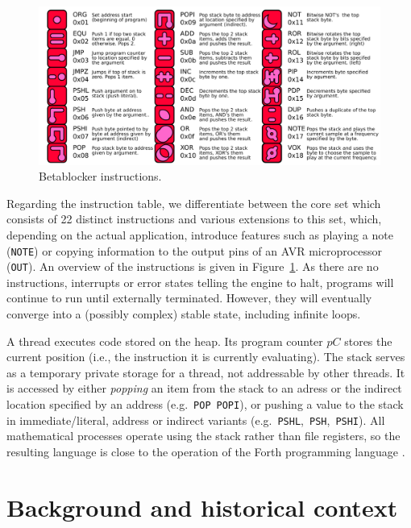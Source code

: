 \documentclass[letterpaper, 12pt]{article}
\begin{document}
\begin{figure}
	\centering
		\includegraphics[width=13cm]{bbds-legend}
	\caption{Betablocker instructions.}
	\label{fig:fig_bbds-legend}
\end{figure}


Regarding the instruction table, we differentiate between the core set which consists of 22 distinct instructions and various extensions to this set, which, depending on the actual application, introduce features such as playing a note (\texttt{NOTE}) or copying information to the output pins of an AVR microprocessor (\texttt{OUT}).
An overview of the instructions is given in Figure~\ref{fig:fig_bbds-legend}.
As there are no instructions, interrupts or error states telling the engine to halt, programs will continue to run until externally terminated.
However, they will eventually converge into a (possibly complex) stable state, including infinite loops.

A thread executes code stored on the heap. 
Its program counter $pC$ stores the current position (i.e., the instruction it is currently evaluating).
The stack serves as a temporary private storage for a thread, not addressable by other threads. 
It is accessed by either \emph{popping} an item from the stack to an adress or the indirect location specified by an address (e.g.~\texttt{POP}~\texttt{POPI}), or pushing a value to the stack in immediate/literal, address or indirect variants  (e.g.~\texttt{PSHL},~\texttt{PSH},~\texttt{PSHI}). All mathematical processes operate using the stack rather than file registers, so the resulting language is close to the operation of the Forth programming language \citep{rather1993-the}.


\parskip 18pt

\section{Background and historical context} 
\label{sec:background}
\end{document}
